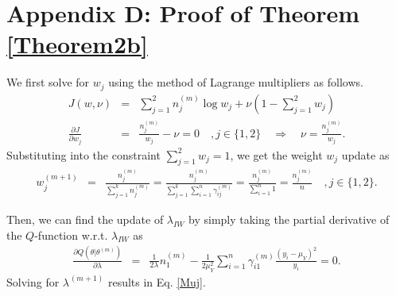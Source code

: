 \documentclass[12pt, draftclsnofoot, onecolumn]{IEEEtran}
\theoremstyle{plain}
\begin{document}
\section*{Appendix D: Proof of Theorem \ref{Theorem2b}}\vspace{-.05in}
We first solve for $w_j$ using the method of Lagrange multipliers as follows. %
\begin{eqnarray}
J(w,\nu)&=&\sum_{j=1}^2 n_{j}^{(m)} \log w_j +\nu \left( 1-\sum_{j=1}^2 w_{j} \right)\nonumber\\
%
\frac{\partial J}{\partial w_j}&=&\frac{n_j^{(m)}}{w_j}-\nu=0 \quad, j \in \{1,2\} \quad \Rightarrow \quad %
%
\nu =\frac{n_j^{(m)}}{w_j} \label{Lagrange}.
\end{eqnarray}
Substituting into the constraint $\sum_{j=1}^2 w_j=1$, we get the weight $w_j$ update as
\begin{eqnarray}
w_j^{(m+1)}&=&\frac{n_{j}^{(m)}}{\sum_{j=1}^k n_{j}^{(m)}}%
=\frac{n_{j}^{(m)}}{\sum_{j=1}^k \sum_{i=1}^n \gamma_{ij}^{(m)}
} %
=\frac{n_{j}^{(m)}}{\sum_{i=1}^n 1}=\frac{n_{j}^{(m)}}{n} \quad, j \in \{1,2\}.\label{Wj}
\end{eqnarray}

Then, we can find the update of $\lambda_{IW}$ by simply taking the partial derivative of the $Q$-function w.r.t. $\lambda_{IW}$ as \vspace{-.1in} %
\begin{eqnarray}
\frac{\partial Q\left({{{\theta}}}|{{{\theta}}}^{(m)} \right)}{\partial {{\lambda_{}}}}&=& \frac{1}{2 {{\lambda_{}}}} n_1^{(m)} - \frac{1}{2\mu_Y^2} \sum_{i=1}^n \gamma_{i1}^{(m)} \frac{(y_i-\mu_Y)^2}{y_i}  =0. %
\end{eqnarray}
Solving for ${{\lambda_{}}}^{(m+1)}$ %
results in Eq. \eqref{Muj}.
\end{document}
